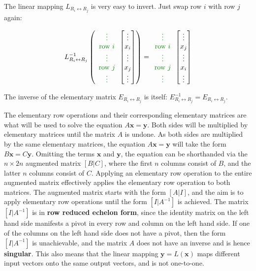 \documentclass{article}
\newcommand{\dg}[1]{\textcolor{dark_green}{#1}}
\begin{document}
The linear mapping \(L_{R_i \leftrightarrow R_j}\) is very easy to invert. Just swap row \(i\) with row \(j\) again: 

\[L_{R_i \leftrightarrow R_j}^{-1}\left(\dg{\begin{array}{c} \vdots \\ \text{row \(i\)} \\ \vdots \\ \text{row \(j\)} \\ \vdots \end{array}}\begin{bmatrix} \vdots \\ x_i \\ \vdots \\ x_j \\ \vdots \end{bmatrix}\right) = \dg{\begin{array}{c} \vdots \\ \text{row \(i\)} \\ \vdots \\ \text{row \(j\)} \\ \vdots \end{array}}\begin{bmatrix} \vdots \\ x_j \\ \vdots \\ x_i \\ \vdots \end{bmatrix}\]

The inverse of the elementary matrix \(E_{R_i \leftrightarrow R_j}\) is itself: \(E_{R_i \leftrightarrow R_j}^{-1} = E_{R_i \leftrightarrow R_j}\).

The elementary row operations and their corresponding elementary matrices are what will be used to solve the equation \(A\mathbf{x} = \mathbf{y}\). Both sides will be multiplied by elementary matrices until the matrix \(A\) is undone. As both sides are multiplied by the same elementary matrices, the equation \(A\mathbf{x} = \mathbf{y}\) will take the form \(B\mathbf{x} = C\mathbf{y}\). Omitting the terms \(\mathbf{x}\) and \(\mathbf{y}\), the equation can be shorthanded via the \(n \times 2n\) augmented matrix \([B|C]\), where the first \(n\) columns consist of \(B\), and the latter \(n\) columns consist of \(C\). Applying an elementary row operation to the entire augmented matrix effectively applies the elementary row operation to both matrices. The augmented matrix starts with the form \([A|I]\), and the aim is to apply elementary row operations until the form \([I|A^{-1}]\) is achieved. The matrix \([I|A^{-1}]\) is in {\bf row reduced echelon form}, since the identity matrix on the left hand side manifests a pivot in every row and column on the left hand side. If one of the columns on the left hand side does not have a pivot, then the form \([I|A^{-1}]\) is unachievable, and the matrix \(A\) does not have an inverse and is hence {\bf singular}. This also means that the linear mapping \(\mathbf{y} = L(\mathbf{x})\) maps different input vectors onto the same output vectors, and is not one-to-one. 
\end{document}
